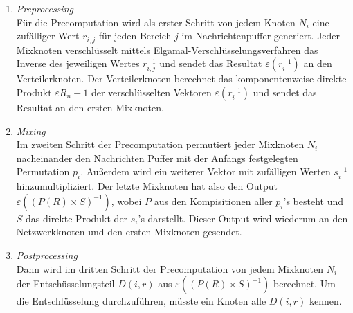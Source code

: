 \documentclass[
    fontsize=12pt,
    headings=small,
    parskip=half,           %
    bibliography=totoc,
    numbers=noenddot,       %
    open=any,               %
    ]{scrreprt}
\begin{document}
\begin{enumerate}
	\item \textit{Preprocessing} \\
	Für die Precomputation wird als erster Schritt von jedem Knoten $N_i$ eine zufälliger Wert $r_{i,j}$ für jeden Bereich $j$ im Nachrichtenpuffer generiert.
Jeder Mixknoten verschlüsselt mittels Elgamal-Verschlüsselungsverfahren
das Inverse des jeweiligen Wertes $r_{i,j}^{-1}$ und sendet das Resultat $\varepsilon (r_i^{-1})$ an den Verteilerknoten.
Der Verteilerknoten berechnet das komponentenweise direkte Produkt $\varepsilon R{_n-1}$ der verschlüsselten Vektoren $\varepsilon (r_i^{-1})$ und sendet das Resultat an den ersten Mixknoten.
	
	\item \textit{Mixing} \\
	Im zweiten Schritt der Precomputation permutiert jeder Mixknoten $N_i$ nacheinander den Nachrichten Puffer mit der Anfangs festgelegten Permutation $p_i$.
Außerdem wird ein weiterer Vektor mit zufälligen Werten $s_i^{-1}$ hinzumultipliziert.
Der letzte Mixknoten hat also den Output $\varepsilon ((P(R) \times S )^{-1})$,
wobei $P$ aus den Kompisitionen aller $p_i$'s besteht und $S$ das direkte Produkt der $s_i$'s darstellt.
Dieser Output wird wiederum an den Netzwerkknoten und den ersten Mixknoten gesendet.

	\item \textit{Postprocessing} \\
	Dann wird im dritten Schritt der Precomputation von jedem Mixknoten $N_i$ 
der Entschüsselungsteil $D(i,r)$ aus $\varepsilon ((P(R) \times S )^{-1})$ berechnet.
Um die Entschlüsselung durchzuführen, müsste ein Knoten alle $D(i,r)$ kennen.
\end{enumerate}
\end{document}
